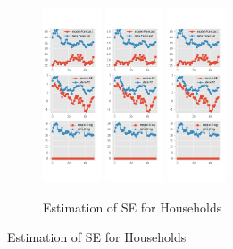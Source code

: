 \documentclass[]{article}
\begin{document}
\begin{figure}[ht]
	\centering
	\begin{subfigure}[b]{\textwidth}
		\centering
		\caption{Estimation of SE for Households}
		\label{SE_diag_SCE}
		\includegraphics[width=0.19\textwidth]{figures/sce_se_est_diag0.png}
		\includegraphics[width=0.19\textwidth]{figures/sce_se_est_diag1.png}
		\includegraphics[width=0.19\textwidth]{figures/sce_se_est_diag2.png}

\end{subfigure}
\end{figure}
\end{document}
